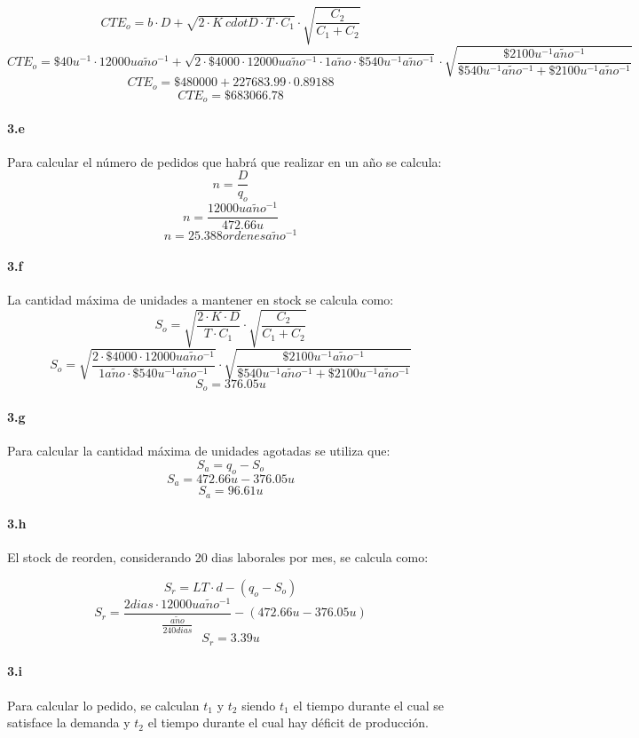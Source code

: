 \documentclass{article}
\def \anio {a\tilde{n}o}
\begin{document}
  $$CTE_o = b \cdot D + \sqrt{2 \cdot K \ cdot D \cdot T \cdot C_1} \cdot \sqrt{\frac{C_2}{C_1 + C_2}} $$
  $$CTE_o = \$40 u^{-1} \cdot 12000 u \anio^{-1} + \sqrt{2 \cdot \$4000 \cdot 12000 u \anio^{-1} \cdot 1 \anio \cdot \$540 u^{-1}\anio^{-1} } \cdot \sqrt{\frac{\$2100 u^{-1}\anio^{-1}}{\$540 u^{-1}\anio^{-1} + \$2100 u^{-1}\anio^{-1}}} $$
  $$CTE_o = \$480000 + 227683.99 \cdot 0.89188 $$ 
  $$\boxed{CTE_o = \$683066.78}$$

  \paragraph{3.e}
  Para calcular el n\'umero de pedidos que habr\'a que realizar en un a\~no se calcula:
  $$n = \frac{D}{q_o} $$
  $$n = \frac{12000 u \anio^{-1}}{472.66 u} $$
  $$\boxed{n = 25.388 ordenes \anio^{-1}} $$

  \paragraph{3.f}
  La cantidad m\'axima de unidades a mantener en stock se calcula como:
  $$S_o = \sqrt{\frac{2 \cdot K \cdot D}{T \cdot C_1}} \cdot \sqrt{\frac{C_2}{C_1 + C_2}} $$
  $$S_o = \sqrt{\frac{2 \cdot \$4000 \cdot 12000 u \anio^{-1}}{1 \anio \cdot \$540 u^{-1}\anio^{-1} }} \cdot \sqrt{\frac{\$2100 u^{-1}\anio^{-1}}{\$540 u^{-1}\anio^{-1} + \$2100 u^{-1}\anio^{-1}}} $$
  $$\boxed{S_o = 376.05 u} $$

  \paragraph{3.g}
  Para calcular la cantidad m\'axima de unidades agotadas se utiliza que:
  $$S_a = q_o - S_o $$
  $$S_a = 472.66 u - 376.05 u $$
  $$\boxed{S_a = 96.61 u } $$

 \paragraph{3.h}
 El stock de reorden, considerando 20 dias laborales por mes, se calcula como:
  
 $$S_r = LT \cdot d - (q_o - S_o) $$
 $$S_r =  \frac{2dias \cdot 12000 u \anio^{-1}}{\frac{\anio}{240 dias}} - ( 472.66 u - 376.05 u) $$
 $$\boxed{S_r = 3.39 u} $$

  \paragraph{3.i}
  Para calcular lo pedido, se calculan $t_1$ y $t_2$ siendo $t_1$ el tiempo durante el cual se satisface la demanda y $t_2$ el tiempo durante el cual hay d\'eficit de producci\'on.
\end{document}
